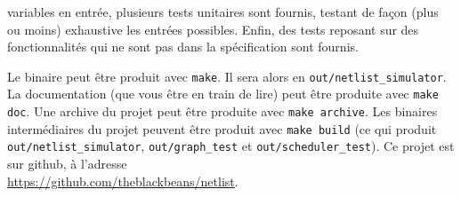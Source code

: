 \documentclass{scrartcl}
\begin{document}
variables en entrée, plusieurs tests unitaires sont fournis, testant de façon
(plus ou moins) exhaustive les entrées possibles. Enfin, des tests reposant sur
des fonctionnalités qui ne sont pas dans la spécification sont fournis.\par
Le binaire peut être produit avec \verb|make|. Il sera alors en
\verb|out/netlist_simulator|. La documentation (que vous être en train de lire)
peut être produite avec \verb|make doc|. Une archive du projet peut être produite
avec \verb|make archive|. Les binaires intermédiaires du projet peuvent être
produit avec \verb|make build| (ce qui produit \verb|out/netlist_simulator|,
\verb|out/graph_test| et \verb|out/scheduler_test|). Ce projet est sur github, à
l'adresse\\
\url{https://github.com/theblackbeans/netlist}.
\end{document}
